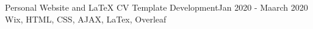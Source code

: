 \begin{projects}
   \project   
    {Personal Website and LaTeX CV Template Development}{Jan 2020 - Maarch 2020}
    { }
    {\vspace*{-10px}}
    {Wix, HTML, CSS, AJAX, LaTex, Overleaf}
        
\end{projects}